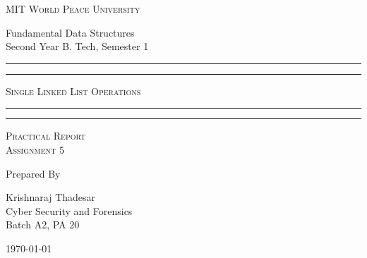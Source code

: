 \documentclass[11pt]{article}
\begin{document}
\begin{titlepage}
	\centering


	\huge\textsc{
		MIT World Peace University
	}\\

	\vspace{0.75\baselineskip} %

	\LARGE{
		Fundamental Data Structures\\
		Second Year B. Tech, Semester 1
	}

	\vfill %


	\rule{\textwidth}{1.6pt}\vspace*{-\baselineskip}\vspace*{2pt}
	\rule{\textwidth}{0.6pt}
	\vspace{0.75\baselineskip} %



	\huge{\textsc{
			Single Linked List Operations
		}} \\



	\vspace{0.5\baselineskip} %
	\rule{\textwidth}{0.6pt}\vspace*{-\baselineskip}\vspace*{2.8pt}
	\rule{\textwidth}{1.6pt}

	\vspace{1\baselineskip} %


	\LARGE\textsc{
		Practical Report\\
		Assignment 5
	} %
	\vfill


	Prepared By
	\vspace{0.5\baselineskip} %

	\Large{
		Krishnaraj Thadesar \\
		Cyber Security and Forensics\\
		Batch A2, PA 20
	}


	\vspace{0.5\baselineskip} %
	\today

\end{titlepage}
\end{document}
